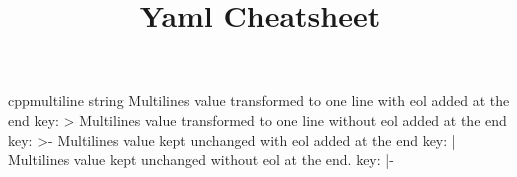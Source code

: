 \documentclass[10pt,a4paper]{article}
\title{\color{w3schools}Yaml Cheatsheet
}
\begin{document}
\maketitle
\small
\begin{multicols}{3}

\thispagestyle{empty}
\scriptsize

% 




\begin{codebox}{cpp}{multiline string}
Multilines value transformed to one line with eol added at the end
key: >
Multilines value transformed to one line without eol added at the end
key: >-
Multilines value kept unchanged with eol added at the end
key: |
Multilines value kept unchanged without eol at the end.
key: |-

\end{codebox}


\AtNextBibliography{\footnotesize}
\printbibliography  
\end{multicols}
\end{document}
